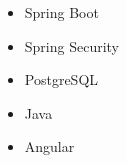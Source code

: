 \begin{itemize}
    \item Spring Boot
    \item Spring Security
    \item PostgreSQL
    \item Java
    \item Angular
\end{itemize}
